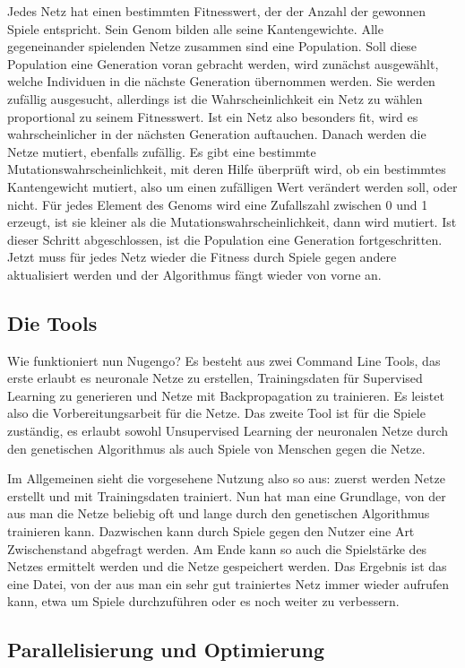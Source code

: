Jedes Netz hat einen bestimmten Fitnesswert, der der Anzahl der gewonnen Spiele
entspricht. Sein Genom bilden alle seine Kantengewichte. Alle gegeneinander
spielenden Netze zusammen sind eine Population. Soll diese Population eine
Generation voran gebracht werden, wird zunächst ausgewählt, welche Individuen in
die nächste Generation übernommen werden. Sie werden zufällig ausgesucht,
allerdings ist die Wahrscheinlichkeit ein Netz zu wählen proportional zu seinem
Fitnesswert. Ist ein Netz also besonders fit, wird es wahrscheinlicher in der
nächsten Generation auftauchen. Danach werden die Netze mutiert, ebenfalls
zufällig. Es gibt eine bestimmte Mutationswahrscheinlichkeit, mit deren Hilfe
überprüft wird, ob ein bestimmtes Kantengewicht mutiert, also um einen
zufälligen Wert verändert werden soll, oder nicht. Für jedes Element des Genoms
wird eine Zufallszahl zwischen 0 und 1 erzeugt, ist sie kleiner als die
Mutationswahrscheinlichkeit, dann wird mutiert. Ist dieser Schritt
abgeschlossen, ist die Population eine Generation fortgeschritten. Jetzt muss
für jedes Netz wieder die Fitness durch Spiele gegen andere aktualisiert werden
und der Algorithmus fängt wieder von vorne an.

\subsection{Die Tools}
Wie funktioniert nun Nugengo? Es besteht aus zwei Command Line Tools, das erste
erlaubt es neuronale Netze zu erstellen, Trainingsdaten für Supervised Learning
zu generieren und Netze mit Backpropagation zu trainieren. Es leistet also die
Vorbereitungsarbeit für die Netze. Das zweite Tool ist für die Spiele zuständig,
es erlaubt sowohl Unsupervised Learning der neuronalen Netze durch den
genetischen Algorithmus als auch Spiele von Menschen gegen die Netze. 

Im Allgemeinen sieht die vorgesehene Nutzung also so aus: zuerst werden Netze
erstellt und mit Trainingsdaten trainiert. Nun hat man eine Grundlage, von der
aus man die Netze beliebig oft und lange durch den genetischen Algorithmus
trainieren kann. Dazwischen kann durch Spiele gegen den Nutzer eine Art
Zwischenstand abgefragt werden. Am Ende kann so auch die Spielstärke des Netzes
ermittelt werden und die Netze gespeichert werden. Das Ergebnis ist das eine
Datei, von der aus man ein sehr gut trainiertes Netz immer wieder aufrufen kann,
etwa um Spiele durchzuführen oder es noch weiter zu verbessern.
 
\subsection{Parallelisierung und Optimierung}
